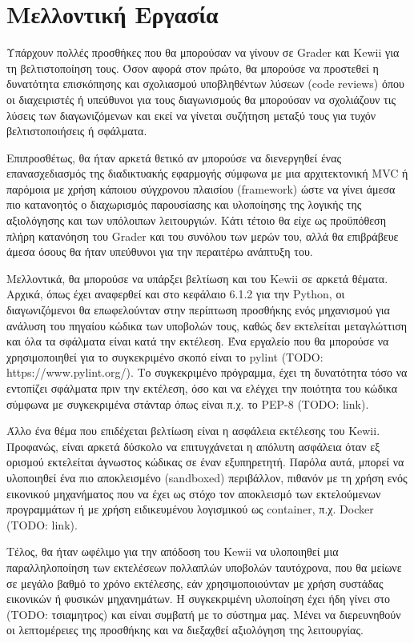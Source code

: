 \documentclass[diploma]{softlab-thesis}
\begin{document}
\section{Μελλοντική Εργασία}

Υπάρχουν πολλές προσθήκες που θα μπορούσαν να γίνουν σε Grader και Kewii για τη
βελτιστοποίηση τους. Όσον αφορά στον πρώτο, θα μπορούσε να προστεθεί η δυνατότητα
επισκόπησης και σχολιασμού υποβληθέντων λύσεων (code reviews) όπου οι διαχειριστές
ή υπεύθυνοι για τους διαγωνισμούς θα μπορούσαν να σχολιάζουν τις λύσεις των
διαγωνιζόμενων και εκεί να γίνεται συζήτηση μεταξύ τους για τυχόν βελτιστοποιήσεις
ή σφάλματα.

\bigskip

Επιπροσθέτως, θα ήταν αρκετά θετικό αν μπορούσε να διενεργηθεί ένας επανασχεδιασμός
της διαδικτυακής εφαρμογής σύμφωνα με μια αρχιτεκτονική MVC ή παρόμοια με χρήση
κάποιου σύγχρονου πλαισίου (framework) ώστε να γίνει άμεσα πιο κατανοητός ο
διαχωρισμός παρουσίασης και υλοποίησης της λογικής της αξιολόγησης και των
υπόλοιπων λειτουργιών. Κάτι τέτοιο θα είχε ως προϋπόθεση πλήρη κατανόηση του Grader
και του συνόλου των μερών του, αλλά θα επιβράβευε άμεσα όσους θα ήταν υπεύθυνοι για
την περαιτέρω ανάπτυξη του.

\bigskip

Μελλοντικά, θα μπορούσε να υπάρξει βελτίωση και του Kewii σε αρκετά θέματα.
Αρχικά, όπως έχει αναφερθεί και στο κεφάλαιο 6.1.2 για την Python, οι
διαγωνιζόμενοι θα επωφελούνταν στην περίπτωση προσθήκης ενός μηχανισμού για
ανάλυση του πηγαίου κώδικα των υποβολών τους, καθώς δεν εκτελείται μεταγλώττιση
και όλα τα σφάλματα είναι κατά την εκτέλεση. Ένα εργαλείο που θα μπορούσε να
χρησιμοποιηθεί για το συγκεκριμένο σκοπό είναι το pylint (TODO:
https://www.pylint.org/). Το συγκεκριμένο πρόγραμμα, έχει τη δυνατότητα τόσο να
εντοπίζει σφάλματα πριν την εκτέλεση, όσο και να ελέγχει την ποιότητα του
κώδικα σύμφωνα με συγκεκριμένα στάνταρ όπως είναι π.χ.  το PEP-8 (TODO: link).

\bigskip

Άλλο ένα θέμα που επιδέχεται βελτίωση είναι η ασφάλεια εκτέλεσης του Kewii.
Προφανώς, είναι αρκετά δύσκολο να επιτυγχάνεται η απόλυτη ασφάλεια όταν εξ ορισμού
εκτελείται άγνωστος κώδικας σε έναν εξυπηρετητή. Παρόλα αυτά, μπορεί να υλοποιηθεί
ένα πιο αποκλεισμένο (sandboxed) περιβάλλον, πιθανόν με τη χρήση ενός εικονικού
μηχανήματος που να έχει ως στόχο τον αποκλεισμό των εκτελούμενων προγραμμάτων ή
με χρήση ειδικευμένου λογισμικού ως container, π.χ. Docker (TODO: link).

\bigskip

Τέλος, θα ήταν ωφέλιμο για την απόδοση του Kewii να υλοποιηθεί μια παραλληλοποίηση
των εκτελέσεων πολλαπλών υποβολών ταυτόχρονα, που θα μείωνε σε μεγάλο βαθμό το
χρόνο εκτέλεσης, εάν χρησιμοποιούνταν με χρήση συστάδας εικονικών ή φυσικών
μηχανημάτων. Η συγκεκριμένη υλοποίηση έχει ήδη γίνει στο (TODO: τσιαμητρος) και
είναι συμβατή με το σύστημα μας. Μένει να διερευνηθούν οι λεπτομέρειες της
προσθήκης και να διεξαχθεί αξιολόγηση της λειτουργίας.




\end{document}
